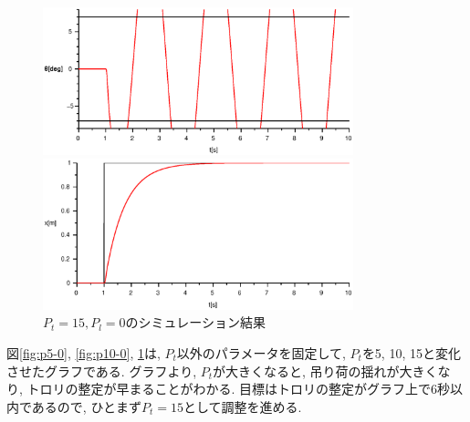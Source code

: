 \documentclass[titlepage]{jsarticle}
\begin{document}
            \begin{figure}[h]
                \begin{minipage}{0.5\hsize}
                    \centering
                    \includegraphics[width=9cm]{img/P15-0t.eps}
                \end{minipage}
                \begin{minipage}{0.5\hsize}
                    \centering
                    \includegraphics[width=9cm]{img/P15-0x.eps}
                \end{minipage}
                \caption{$P_t = 15, P_l = 0$のシミュレーション結果}
                \label{fig:p15-0}
            \end{figure}

            図\ref{fig:p5-0}, \ref{fig:p10-0}, \ref{fig:p15-0}は,
            $P_t$以外のパラメータを固定して,
            $P_t$を5, 10, 15と変化させたグラフである.
            グラフより, $P_t$が大きくなると, 吊り荷の揺れが大きくなり,
            トロリの整定が早まることがわかる.
            目標はトロリの整定がグラフ上で6秒以内であるので,
            ひとまず$P_t = 15$として調整を進める.
\end{document}
